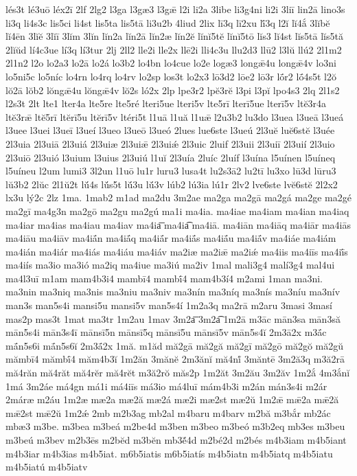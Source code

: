 {lés3t
lé3uō
léx2ī
2lf
2lg2
l3ga
l3gæ3
l3gǣ
l2i
li2a
3libe
li3g4ni
li2i
3liī
lin2ā
lino3s
li3q
li4s3c
lis5ci
li4st
lis5ta
lis5tā
li3u2b
4liud
2lix
lī3q
lī2xu
lī́3q
l2ĭ
lĭ4ắ
3lĭbĕ
lĭ4ēn
3lĭĕ
3lĭī
3lĭm
3lĭn
lĭn2a
lĭn2ā
lĭn2æ
lĭn2ĕ
lĭnĭ5tĕ
lĭnĭ5tō
lĭs3
lĭ4st
lĭs5tā
lĭs5tă
2lĭŭd
lí4c3ue
lí3q
lí3tur
2lj
2ll2
lle2i
lle2x
llē2i
lli4c3u
llu2d3
llū2
l3lŭ
llú2
2l1m2
2l1n2
l2o
lo2a3
lo2ā
lo2á
lo3b2
lo4bn
lo4cue
lo2e
logæ3
longǣ4u
longǣ4v
lo3ni
lo5ni5c
lo5níc
lo4rn
lo4rq
lo4rv
lo2sp
los3t
lo2x3
lō3d2
lōe2
lō3r
lṓr2
lṓ4s5t
l2ŏ
lŏ2ā
lŏb2
lŏngǣ4u
lŏngǣ4v
lŏ2s
ló2x
2lp
lpe3r2
lpĕ3rĕ
l3pi
l3pĭ
lpo4s3
2lq
2l1s2
l2s3t
2lt
lte1
lter4a
lte5re
lte5ré
lteri5ue
lteri5v
lte5rī
lterī5ue
lterī5v
ltĕ3r4a
ltĕ3rǣ
ltĕ5rī
ltĕrī5u
ltĕrī5v
ltéri5t
l1uā
l1uă
l1uǣ
l2u3b2
lu3do
l3uea
l3ueā
l3ueá
l3uee
l3uei
l3ueī
l3ueí
l3ueo
l3ueō
l3ueó
2lues
lue6ste
l3ueú
2l3uĕ
luĕ6stĕ
l3uée
2l3uia
2l3uiā
2l3uiá
2l3uiæ
2l3uiǣ
2l3uiǽ
2l3uic
2luif
2l3uii
2l3uiī
2l3uií
2l3uio
2l3uiō
2l3uió
l3uium
l3uius
2l3uiú
l1uĭ
2l3uía
2luíc
2luíf
l3uína
l5uínen
l5uíneq
l5uíneu
l2um
lumi3
3l2un
l1uō
lu1r
luru3
lusa4t
lu2s3ā2
lu2tī
lu3xo
lū3d
lūru3
lŭ3b2
2lŭc
2l1ŭ2t
lŭ́4s
lŭ́s5t
lŭ́3u
lŭ́3v
lúb2
lú3ia
lú1r
2lv2
lve6ste
lvĕ6stĕ
2l2x2
lx3u
lý2c
2lz
1ma.
1mab2
m1ad
ma2du
3m2ae
ma2ga
ma2gā
ma2gá
ma2ge
ma2gé
ma2gī
ma4g3n
ma2gō
ma2gu
ma2gú
ma1i
ma4ia.
ma4iae
ma4iam
ma4ian
ma4iaq
ma4iar
ma4ias
ma4iau
ma4iav
ma4ia͞
ma4ia͡
ma4iā.
ma4iān
ma4iāq
ma4iār
ma4iās
ma4iāu
ma4iāv
ma4iā́n
ma4iā́q
ma4iā́r
ma4iā́s
ma4iā́u
ma4iā́v
ma4iáe
ma4iám
ma4ián
ma4iár
ma4iás
ma4iáu
ma4iáv
ma2iæ
ma2iǣ
ma2iǽ
ma4iis
ma4iīs
ma4iī́s
ma4iís
ma3io
ma3ió
ma2iq
ma4iue
ma3iú
ma2iv
1mal
mali3g4
malí3g4
mal4ui
ma4l3uī
m1am
mam4b3i4
mambī4
mambī́4
mam4b3í4
m2ami
1man
ma3ni.
ma3nin
ma3niq
ma3nis
ma3niu
ma3niv
ma3nín
ma3níq
ma3nís
ma3níu
ma3nív
man3s
man5s4i
mansi5u
mansi5v
man5s4í
1m2a3q
ma2rā
m2aru
3masi
3masí
mas2p
mas3t
1mat
ma3tr
1m2au
1mav
3m2a͞
3m2a͡
1m2ā
m3āc
mān3sa
mān3să
mān5s4i
mān3s4ī
mānsī5n
mānsī5q
mānsī5u
mānsī5v
mān5s4ĭ
2m3ā2x
m3ā́c
mā́n5s6i
mā́n5s6ĭ
2m3ā́2x
1mă.
m1ăd
mă2gā
mă2gă
mă2gī
mă2gō
mă2gŏ
mă2gŭ
mămbī4
mămbī́4
măm4b3ĭ
1m2ăn
3mănĕ
2m3ănĭ
mă4nĭ́
3măntē
3m2ă3q
m3ă2rā
mă4răn
mă4răt
mă4rĕr
mă4rĕt
m3ă2rŏ
măs2p
1m2ăt
3m2ău
3m2ăv
1m2ắ
4m3ắnĭ
1má
3m2áe
má4gn
má1i
má4iīs
má3io
má4luī
mám4b3i
m2án
mán3s4i
m2ár
2máræ
m2áu
1m2æ
mæ2a
mæ2ă
mæ2á
mæ2i
mæ2st
mæ2ŭ
1m2ǣ
mǣ2a
mǣ2ă
mǣ2st
mǣ2ŭ
1m2ǽ
2mb
m2b3ag
mb2al
m4baru
m4barv
m2bă
m3bắr
mb2ác
mbæ3
m3be.
m3bea
m3beá
m2be4d
m3ben
m3beo
m3beó
m3b2eq
mb3es
m3beu
m3beú
m3bev
m2b3ēs
m2bĕd
m3bĕn
mb3ĕ́4d
m2bé2d
m2bés
m4b3iam
m4b5iant
m4b3iar
m4b3ias
m4b5iat.
m6b5iatis
m6b5iatís
m4b5iatn
m4b5iatq
m4b5iatu
m4b5iatú
m4b5iatv
}
